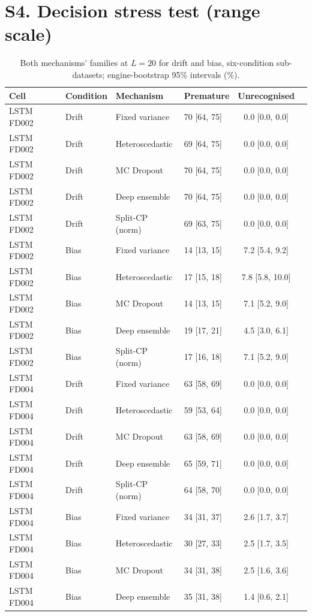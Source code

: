 \documentclass[10pt,a4paper]{article}
\begin{document}
\section*{S4. Decision stress test (range scale)}
\begin{table}[H]\centering\scriptsize
\caption{Both mechanisms' families at $L=20$ for drift and bias, six-condition sub-datasets; engine-bootstrap 95\% intervals (\%).}
\begin{tabular}{llllcc}\toprule
Cell & Condition & Mechanism & Premature & Unrecognised \\ \midrule
LSTM FD002 & Drift & Fixed variance & 70 [64, 75] & 0.0 [0.0, 0.0] \\
LSTM FD002 & Drift & Heteroscedastic & 69 [64, 75] & 0.0 [0.0, 0.0] \\
LSTM FD002 & Drift & MC Dropout & 70 [64, 75] & 0.0 [0.0, 0.0] \\
LSTM FD002 & Drift & Deep ensemble & 70 [64, 75] & 0.0 [0.0, 0.0] \\
LSTM FD002 & Drift & Split-CP (norm) & 69 [63, 75] & 0.0 [0.0, 0.0] \\
LSTM FD002 & Bias & Fixed variance & 14 [13, 15] & 7.2 [5.4, 9.2] \\
LSTM FD002 & Bias & Heteroscedastic & 17 [15, 18] & 7.8 [5.8, 10.0] \\
LSTM FD002 & Bias & MC Dropout & 14 [13, 15] & 7.1 [5.2, 9.0] \\
LSTM FD002 & Bias & Deep ensemble & 19 [17, 21] & 4.5 [3.0, 6.1] \\
LSTM FD002 & Bias & Split-CP (norm) & 17 [16, 18] & 7.1 [5.2, 9.0] \\
LSTM FD004 & Drift & Fixed variance & 63 [58, 69] & 0.0 [0.0, 0.0] \\
LSTM FD004 & Drift & Heteroscedastic & 59 [53, 64] & 0.0 [0.0, 0.0] \\
LSTM FD004 & Drift & MC Dropout & 63 [58, 69] & 0.0 [0.0, 0.0] \\
LSTM FD004 & Drift & Deep ensemble & 65 [59, 71] & 0.0 [0.0, 0.0] \\
LSTM FD004 & Drift & Split-CP (norm) & 64 [58, 70] & 0.0 [0.0, 0.0] \\
LSTM FD004 & Bias & Fixed variance & 34 [31, 37] & 2.6 [1.7, 3.7] \\
LSTM FD004 & Bias & Heteroscedastic & 30 [27, 33] & 2.5 [1.7, 3.5] \\
LSTM FD004 & Bias & MC Dropout & 34 [31, 38] & 2.5 [1.6, 3.6] \\
LSTM FD004 & Bias & Deep ensemble & 35 [31, 38] & 1.4 [0.6, 2.1] \\

\end{tabular}
\end{table}
\end{document}
